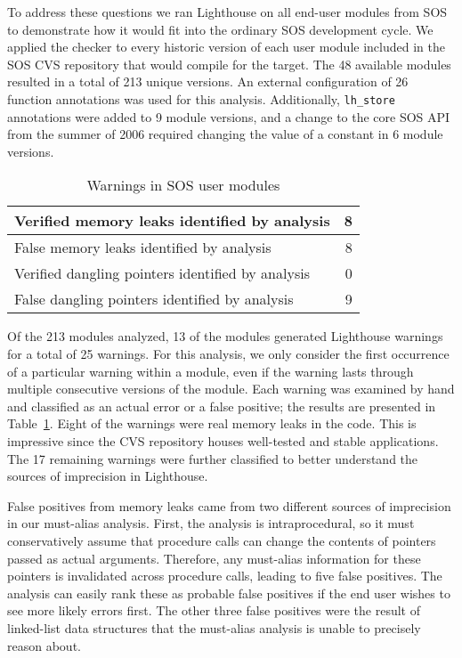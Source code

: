 To address these questions we ran Lighthouse on 
all end-user modules from SOS
to demonstrate
how it would fit into the ordinary SOS development cycle.  
We applied the checker to every
historic version of each user module included in the SOS CVS
repository that would compile for the  target.  The 48
available modules resulted in a total of 213 unique versions.
%
An external configuration of 26 function annotations was used for this
analysis.
%
Additionally, {\tt lh\_store} annotations were added to 9 module versions,
and a change to the core SOS API from the summer of 2006 required
changing the value of a constant in 6 module versions.


\begin{table}
\caption{Warnings in SOS user modules}
%
\label{tab:module}
\centering 
\begin{tabular}{| l | r |}
    \hline 
    Verified memory leaks identified by analysis & 8 \\
    \hline
    False memory leaks identified by analysis & 8 \\
    \hline 
    Verified dangling pointers identified by analysis & 0 \\
    \hline 
    False dangling pointers identified by analysis & 9 \\
    \hline 
\end{tabular} 
%
\end{table}

Of the 213 modules analyzed, 13 of the modules generated Lighthouse 
warnings for a
total of 25 warnings.
For this
analysis, we only consider the first occurrence of a particular warning
within a module, even if the warning lasts through multiple consecutive
versions of the module.  
%
Each warning was examined by hand and classified as an actual error or
a false positive; the results are presented in Table~\ref{tab:module}.  
%
Eight of the warnings were real memory leaks in the code.
This is impressive since the CVS repository houses well-tested and stable
applications.
%
The 17 remaining warnings were further classified to better understand
the sources of imprecision in Lighthouse.  

\smallskip{}

False positives from memory leaks came from two different sources of
imprecision in our must-alias analysis.
First, the analysis is intraprocedural, so it must
conservatively
assume that procedure calls can change the contents of pointers passed
as actual arguments.  Therefore, any must-alias information for these
pointers is invalidated across procedure calls, leading to five false
positives.
The analysis can easily rank these as probable false
positives if the end user wishes to see more likely errors first.  The
other three false positives were the result of linked-list data structures
that the must-alias analysis is unable to precisely reason about.  

